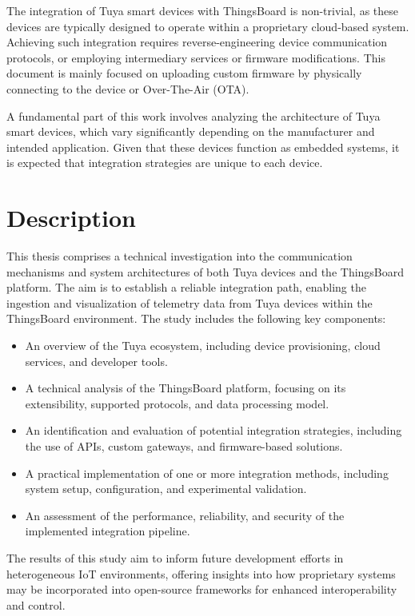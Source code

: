 The integration of Tuya smart devices with ThingsBoard is non-trivial, as these devices are typically designed to operate within a proprietary cloud-based system. Achieving such integration requires reverse-engineering device communication protocols, or employing intermediary services or firmware modifications. This document is mainly focused on uploading custom firmware by physically connecting to the device or Over-The-Air (OTA).

A fundamental part of this work involves analyzing the architecture of Tuya smart devices, which vary significantly depending on the manufacturer and intended application. Given that these devices function as embedded systems, it is expected that integration strategies are unique to each device.

\section{Description}

This thesis comprises a technical investigation into the communication mechanisms and system architectures of both Tuya devices and the ThingsBoard platform. The aim is to establish a reliable integration path, enabling the ingestion and visualization of telemetry data from Tuya devices within the ThingsBoard environment. The study includes the following key components:

\begin{itemize}
	\item An overview of the Tuya ecosystem, including device provisioning, cloud services, and developer tools.
	\item A technical analysis of the ThingsBoard platform, focusing on its extensibility, supported protocols, and data processing model.
	\item An identification and evaluation of potential integration strategies, including the use of APIs, custom gateways, and firmware-based solutions.
	\item A practical implementation of one or more integration methods, including system setup, configuration, and experimental validation.
	\item An assessment of the performance, reliability, and security of the implemented integration pipeline.
\end{itemize}

The results of this study aim to inform future development efforts in heterogeneous IoT environments, offering insights into how proprietary systems may be incorporated into open-source frameworks for enhanced interoperability and control.

